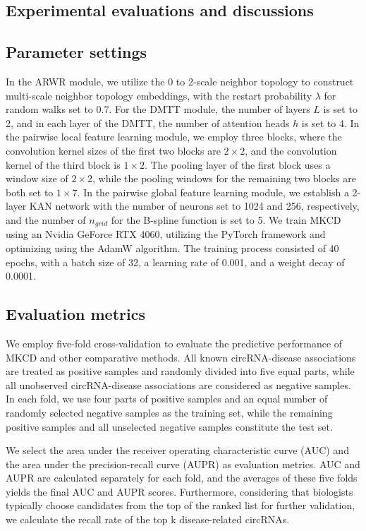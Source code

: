 \documentclass{bioinfo}
\begin{document}
\begin{methods}
\section{Experimental evaluations and discussions}	
\subsection{Parameter settings}
In the ARWR module, we utilize the 0 to 2-scale neighbor topology to construct multi-scale neighbor topology embeddings, with the restart probability $\lambda$ for random walks set to 0.7. For the DMTT module, the number of layers $L$ is set to 2, and in each layer of the DMTT, the number of attention heads $h$ is set to 4. In the pairwise local feature learning module, we employ three blocks, where the convolution kernel sizes of the first two blocks are $2\times 2$, and the convolution kernel of the third block is $1\times 2$. The pooling layer of the first block uses a window size of $2\times 2$, while the pooling windows for the remaining two blocks are both set to $1\times 7$. In the pairwise global feature learning module, we establish a 2-layer KAN network with the number of neurons set to 1024 and 256, respectively, and the number of $n_{grid}$ for the B-spline function is set to 5. We train MKCD using an Nvidia GeForce RTX 4060, utilizing the PyTorch framework and optimizing using the AdamW algorithm. The training process consisted of 40 epochs, with a batch size of 32, a learning rate of 0.001, and a weight decay of 0.0001.

\vspace{0.3cm}


\subsection{Evaluation metrics}
We employ five-fold cross-validation to evaluate the predictive performance of MKCD and other comparative methods. All known circRNA-disease associations are treated as positive samples and randomly divided into five equal parts, while all unobserved circRNA-disease associations are considered as negative samples. In each fold, we use four parts of positive samples and an equal number of randomly selected negative samples as the training set, while the remaining positive samples and all unselected negative samples constitute the test set.

We select the area under the receiver operating characteristic curve (AUC) \cite{hajian2013receiver} and the area under the precision-recall curve (AUPR) \cite{saito2015precision} as evaluation metrics. AUC and AUPR are calculated separately for each fold, and the averages of these five folds yields the final AUC and AUPR scores. Furthermore, considering that biologists typically choose candidates from the top of the ranked list for further validation, we calculate the recall rate of the top k disease-related circRNAs.


\end{methods}
\end{document}
